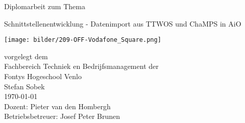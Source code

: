 

\begin{titlepage}
\vspace{4em}
\center
 \Large{\textsf{Diplomarbeit zum Thema}}
 \vspace{1em}

\Huge{\textsf{Schnittstellenentwicklung - Datenimport aus TTWOS und ChaMPS in AiO}}
\vspace{1em}
\\
\begin{center}
	\texttt{[image: bilder/209-OFF-Vodafone\_Square.png]}
\end{center}

\vspace{1em}
\Large{
\textsf{
vorgelegt dem\\
Fachbereich Techniek en Bedrijfsmanagement der\\Fontys Hogeschool Venlo
}
}
\vspace{2em}
\\
\Large{
\textsf{
Stefan Sobek\\
\today
\vspace{2em}
\\
Dozent: Pieter van den Hombergh\\
Betriebsbetreuer: Josef Peter Brunen
}
}
\end{titlepage}